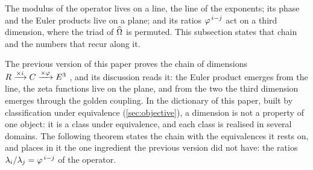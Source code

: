 The modulus of the operator lives on a line, the line of the exponents; its phase and the Euler products live on a
plane; and its ratios $\varphi^{\,i-j}$ act on a third dimension, where the triad of $\widehat{\Omega}$ is permuted.  This
subsection states that chain and the numbers that recur along it.

The previous version of this paper proves the chain of dimensions
$R\xrightarrow{\times i}C\xrightarrow{\times\varphi}E^3$
\cite[\S3.6.1, Proposition `Dimensional chain from self-measurement']{gonzalez26oddzeta}, and its discussion
\cite[\S6]{gonzalez26oddzeta} reads it: the Euler product emerges from the line, the zeta functions live on the
plane, and from the two the third dimension emerges through the golden coupling.  In the dictionary of this paper,
built by classification under equivalence (\cref{sec:objective}), a dimension is not a property of one object: it is
a class under equivalence, and each class is realised in several domains.  The
following theorem states the chain with the equivalences it rests on, and places in it
the one ingredient the previous version did not have: the ratios
$\lambda_i/\lambda_j=\varphi^{\,i-j}$ of the operator.

